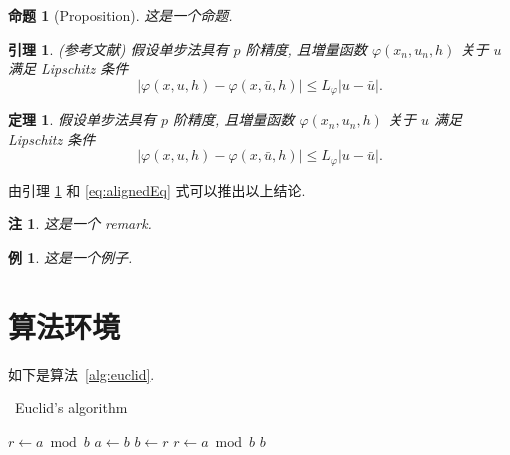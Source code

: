\documentclass[openany,twoside,12pt]{book}
\makeatletter
\theoremstyle{plain}
\newtheorem{proposition}{命题}[chapter]
\newtheorem{lemma}{引理}[chapter]
\newtheorem{theorem}{定理}[chapter]
\newtheorem{example}{例}[chapter]
\newtheorem{remark}{注}[chapter]
\renewcommand{\proofname}{证明}
\renewenvironment{proof}[1][\proofname]{\par
  \pushQED{\qed}%
  \normalfont \topsep6\p@\@plus6\p@\relax
  \trivlist
  \item[\hskip\labelsep\bfseries
  #1\@addpunct{\,:\,}]\ignorespaces
}{%
  \popQED\endtrivlist\@endpefalse
}
\makeatother
\begin{document}
\begin{proposition}[Proposition]
这是一个命题.
\end{proposition}

\begin{lemma}\label{lmm:convergence} {\rm (\textit{参考文献}\cite{LiLiu1997})}
假设单步法具有 $p$ 阶精度, 且増量函数 $\varphi(x_{n}, u_{n}, h)$ 关于 $u$ 满足 Lipschitz 条件
\begin{equation}\label{eq:conver1}
|\varphi(x, u, h)-\varphi(x, \bar{u}, h)| \leqslant L_{\varphi}|u-\bar{u}|.
\end{equation}
\end{lemma}

\begin{theorem}\label{thm:convergence}
假设单步法具有 $p$ 阶精度, 且増量函数 $\varphi(x_{n}, u_{n}, h)$ 关于 $u$ 满足Lipschitz 条件
\begin{equation}\label{eq:conver2}
|\varphi(x, u, h)-\varphi(x, \bar{u}, h)| \leqslant L_{\varphi}|u-\bar{u}|.
\end{equation}
\end{theorem}
\begin{proof}[\normalfont\bfseries 证明~\nopunct]
由引理 \ref{lmm:convergence} 和 \eqref{eq:alignedEq} 式可以推出以上结论.
\end{proof}

\begin{remark}\label{rem:remark}
这是一个 remark.
\end{remark}

\begin{example}
这是一个例子.
\end{example}


\section{算法环境}

如下是算法~\ref{alg:euclid}.
\begin{algorithm}[H]
\small
\caption{~Euclid's algorithm}\label{alg:euclid}
\begin{algorithmic}[1]
  \State $r\gets a\bmod b$
  \State $a\gets b$
  \State $b\gets r$
  \State $r\gets a\bmod b$
  \EndWhile\label{euclidendwhile}
  \State \Return $b$
  \EndProcedure
\end{algorithmic}
\end{algorithm}
\end{document}
